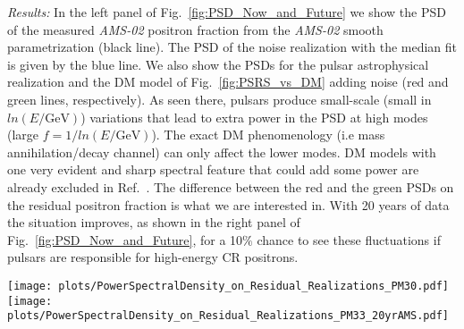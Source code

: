 \documentclass[aps,prd,twocolumn,amsmath,superscriptaddress,amssymb,showpacs,floatfix,nofootinbib]{revtex4-1}
\begin{document}
\textit{Results:} In the left panel of Fig.~\ref{fig:PSD_Now_and_Future}
we show the PSD of the measured \textit{AMS-02} positron
fraction from the \textit{AMS-02} smooth parametrization (black
line).  The PSD of the noise realization with the median fit is
given by the blue line.  We also show the PSDs for the pulsar
astrophysical realization and the DM model
of Fig.~\ref{fig:PSRS_vs_DM} adding noise (red and green lines,
respectively).  As seen there, pulsars produce small-scale
(small in $ln(E/\textrm{GeV})$) variations that lead to
extra power in the PSD at high modes (large $f =
1/ln(E/\textrm{GeV})$). The exact DM phenomenology (i.e mass
annihilation/decay channel) can only affect the lower modes. DM
models with one very evident and sharp spectral feature that
could add some power are already 
excluded in Ref.~\cite{Bergstrom:2013jra, Ibarra:2013zia}. The
difference between the red and the green PSDs on the residual
positron fraction is what we are interested in. With 20 years of
data the situation improves, as shown in the right
panel of Fig.~\ref{fig:PSD_Now_and_Future}, for a
10$\%$ chance to see these fluctuations if pulsars are
responsible for high-energy CR positrons.
\begin{figure*}
\begin{centering}
\hspace{0.35cm}
\texttt{[image: plots/PowerSpectralDensity\_on\_Residual\_Realizations\_PM30.pdf]}
\hspace{-0.05cm}
\texttt{[image: plots/PowerSpectralDensity\_on\_Residual\_Realizations\_PM33\_20yrAMS.pdf]}
\end{centering}
\vspace{-0.6cm}
\caption{The PSD of the residual to the positron fraction from \textit{AMS-02}. \textit{Left}: current state 
with the black line giving the measurement, the blue line the noise realization with median fit and the red and 
green lines a pulsars and a DM realization. Since pulsars have spectral features 
(shown in Fig.~\ref{fig:PSRS_vs_DM}), there is more power at the high modes of the PSD compared to the 
smooth DM realization. \textit{Right}: Same after 20 yr of
\textit{AMS-02} observations. The red line is calculated from one pulsar realization that is among the $\sim$10$\%$
of all our observation realizations, which give a signal in the PSD detectable at $\geq 2 \sigma$.} 
\label{fig:PSD_Now_and_Future}
\end{figure*}
\end{document}
